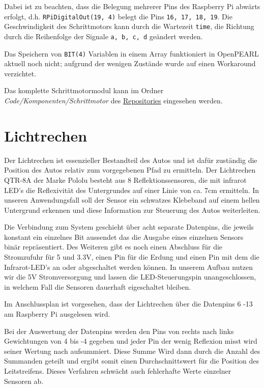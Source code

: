 Dabei ist zu beachten, dass die Belegung mehrerer Pins des Raspberry Pi abwärts erfolgt, d.h. \texttt{RPiDigitalOut(19, 4)} belegt die Pins \texttt{16, 17, 18, 19}. Die Geschwindigkeit des Schrittmotors kann durch die Wartezeit \texttt{time}, die Richtung durch die Reihenfolge der Signale \texttt{a, b, c, d} geändert werden.

Das Speichern von \texttt{BIT(4)} Variablen in einem Array funktioniert in OpenPEARL aktuell noch nicht; aufgrund der wenigen Zustände wurde auf einen Workaround verzichtet.

Das komplette Schrittmotormodul kann im Ordner \emph{Code/Komponenten/Schrittmotor} des \href{https://github.com/OpenPearl-HFUWPV1718/SensorCar}{Repositories} eingesehen werden.\\


\section{Lichtrechen}
Der Lichtrechen ist essenzieller Bestandteil des Autos und ist dafür zuständig die Position des Autos relativ zum vorgegebenen Pfad zu ermitteln. Der Lichtrechen QTR-8A der Marke Pololu besteht aus 8 Reflektionssensoren, die mit infrarot LED’s die Reflexivität des Untergrundes auf einer Linie von ca. 7cm ermitteln. In unseren Anwendungsfall soll der Sensor ein schwatzes Klebeband auf einem hellen Untergrund erkennen und diese Information zur Steuerung des Autos weiterleiten. 

Die Verbindung zum System geschieht über acht separate Datenpins, die jeweils konstant ein einzelnes Bit aussendet das die Ausgabe eines einzelnen Sensors binär repräsentiert. Des Weiteren gibt es noch einen Abschluss für die Stromzufuhr für 5 und 3.3V, einen Pin für die Erdung und einen Pin mit dem die Infrarot-LED’s an oder abgeschaltet werden können. In unserem Aufbau nutzen wir die 5V Stromversorgung und lassen die LED-Steuerungspin unangeschlossen, in welchem Fall die Sensoren dauerhaft eigeschaltet bleiben. 

Im Anschlussplan ist vorgesehen, dass der Lichtrechen über die Datenpins 6 -13 am Raspberry Pi ausgelesen wird.

Bei der Auswertung der Datenpins werden den Pins von rechts nach links Gewichtungen von 4 bis -4 gegeben und jeder Pin der wenig Reflexion misst wird seiner Wertung nach aufsummiert. Diese Summe Wird dann durch die Anzahl des Summanden geteilt und ergibt somit einen Durchschnittswert für die Position des Leitstreifens. Dieses Verfahren schwächt auch fehlerhafte Werte einzelner Sensoren ab.


